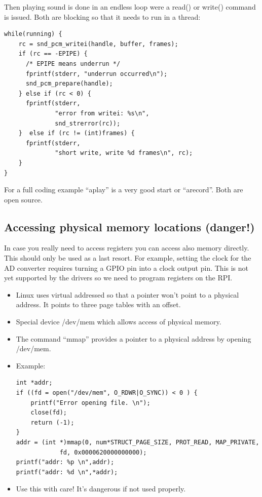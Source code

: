 \documentclass[12pt]{report}
\begin{document}
Then playing sound is done in an endless loop were a read()
or write() command is issued. Both are blocking so that
it needs to run in a thread:

\begin{verbatim}
while(running) {
    rc = snd_pcm_writei(handle, buffer, frames);
    if (rc == -EPIPE) {
      /* EPIPE means underrun */
      fprintf(stderr, "underrun occurred\n");
      snd_pcm_prepare(handle);
    } else if (rc < 0) {
      fprintf(stderr,
              "error from writei: %s\n",
              snd_strerror(rc));
    }  else if (rc != (int)frames) {
      fprintf(stderr,
              "short write, write %d frames\n", rc);
    }
}
\end{verbatim}

For a full coding example ``aplay'' is a very
good start or ``arecord''. Both are open source.




\subsection{Accessing physical memory locations (danger!)}
In case you really need to access registers you can access
also memory directly. This should only be used as a last resort.
For example, setting the clock for the AD converter requires
turning a GPIO pin into a clock output pin. This is not yet
supported by the drivers so we need to program registers
on the RPI.
\begin{itemize}
\item Linux uses virtual addressed so that a pointer won't
point to a physical address. It points to three page
tables with an offset.
\item Special device /dev/mem which allows access of physical
memory.
\item The command ``mmap'' provides a pointer to a physical
address by opening /dev/mem.
\item Example:
\begin{verbatim}
int *addr;
if ((fd = open("/dev/mem", O_RDWR|O_SYNC)) < 0 ) {
    printf("Error opening file. \n");
    close(fd);
    return (-1);
}
addr = (int *)mmap(0, num*STRUCT_PAGE_SIZE, PROT_READ, MAP_PRIVATE,
            fd, 0x0000620000000000);
printf("addr: %p \n",addr);
printf("addr: %d \n",*addr);
\end{verbatim}
\item Use this with care! It's dangerous if not used properly.
\end{itemize}
\end{document}
